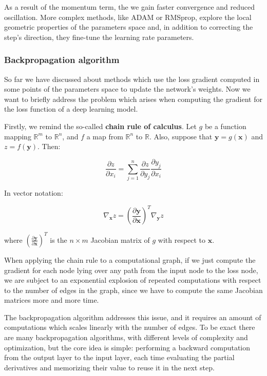\documentclass[a4paper, twoside]{article}
\begin{document}
        As a result of the momentum term, the we gain faster convergence and reduced oscillation.
        More complex methods, like ADAM or RMSprop, explore the local geometric properties of the parameters space and, in addition to correcting the step's direction, they fine-tune the learning rate parameters.


        \subsubsection{Backpropagation algorithm}

        So far we have discussed about methods which use the loss gradient computed in some points of the parameters space to update the network's weights. Now we want to briefly address the problem which arises when computing the gradient for the loss function of a deep learning model.

        Firstly, we remind the so-called \textbf{chain rule of calculus}. Let $g$ be a function mapping $\mathbb{R}^m$ to $\mathbb{R}^n$, and $f$ a map from $\mathbb{R}^n$ to $\mathbb{R}$. Also, suppose that $\boldsymbol{y} = g(\boldsymbol{x})$ and $z = f(\boldsymbol{y})$. Then:

        $$ \frac{\partial z}{\partial x_i} = \sum_{j=1}^n \frac{\partial z}{\partial y_j} \frac{\partial y_j}{\partial x_i}$$

        In vector notation:

        $$ \nabla_{\boldsymbol{x}} z =\left( \frac{\partial \boldsymbol{y}}{\partial \boldsymbol{x}} \right)^T \nabla_{\boldsymbol{y}} z $$

        where $\left( \frac{\partial \boldsymbol{y}}{\partial \boldsymbol{x}} \right)^T$ is the $n \times m$ Jacobian matrix of $g$ with respect to $\boldsymbol{x}$.

        When applying the chain rule to a computational graph, if we just compute the gradient for each node lying over any path from the input node to the loss node, we are subject to an exponential explosion of repeated computations with respect to the number of edges in the graph, since we have to compute the same Jacobian matrices more and more time.

        The backpropagation algorithm addresses this issue, and it requires an amount of computations which scales linearly with the number of edges. To be exact there are many backpropagation algorithms, with different levels of complexity and optimization, but the core idea is simple: performing a backward computation from the output layer to the input layer, each time evaluating the partial derivatives and memorizing their value to reuse it in the next step.
\end{document}
